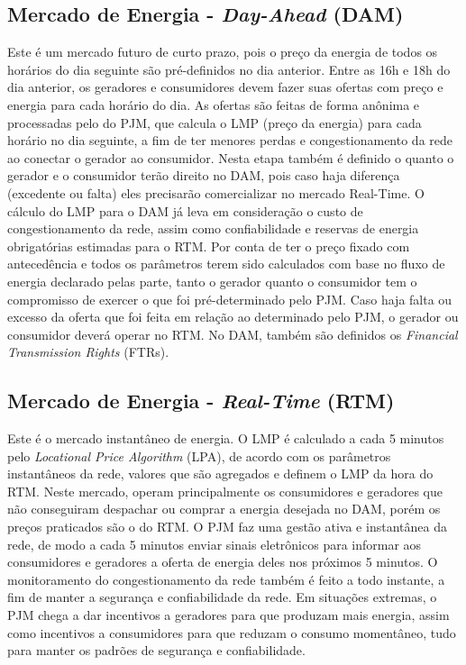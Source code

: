     
\subsection{Mercado de Energia - \textit{Day-Ahead} (DAM)} 
        
Este é um mercado futuro de curto prazo, pois o preço da energia de todos os horários do dia seguinte são pré-definidos no dia anterior. Entre as 16h e 18h do dia anterior, os geradores e consumidores devem fazer suas ofertas com preço e energia para cada horário do dia. As ofertas são feitas de forma anônima e processadas pelo do PJM, que calcula o \ac{LMP} (preço da energia) para cada horário no dia seguinte, a fim de ter menores perdas e congestionamento da rede ao conectar o gerador ao consumidor. Nesta etapa também é definido o quanto o gerador e o consumidor terão direito no \ac{DAM}, pois caso haja diferença (excedente ou falta) eles precisarão comercializar no mercado Real-Time. O cálculo do \ac{LMP} para o \ac{DAM} já leva em consideração o custo de congestionamento da rede, assim como confiabilidade e reservas de energia obrigatórias estimadas para o \ac{RTM}.  Por conta de ter o preço fixado com antecedência e todos os parâmetros terem sido calculados com base no fluxo de energia declarado pelas parte, tanto o gerador quanto o consumidor tem o compromisso de  exercer o que foi pré-determinado pelo PJM. Caso haja falta ou excesso da oferta que foi feita em relação ao determinado pelo PJM, o gerador ou consumidor deverá operar no \ac{RTM}. No \ac{DAM}, também são definidos os \textit{Financial Transmission Rights} (FTRs).

    

\subsection{Mercado de Energia - \textit{Real-Time} (RTM)}

Este é o mercado instantâneo de energia. O \ac{LMP} é calculado a cada 5 minutos pelo \textit{Locational Price Algorithm} (LPA), de acordo com os parâmetros instantâneos da rede, valores que são agregados e definem o \ac{LMP} da hora do \ac{RTM}. Neste mercado, operam principalmente os consumidores e geradores que não conseguiram despachar ou comprar a energia desejada no \ac{DAM}, porém os preços praticados são o do \ac{RTM}. O PJM faz uma gestão ativa e instantânea da rede, de modo a cada 5 minutos enviar sinais eletrônicos para informar aos consumidores e geradores a oferta de energia deles nos próximos 5 minutos. O monitoramento do congestionamento da rede também é feito a todo instante, a fim de manter a segurança e confiabilidade da rede. Em situações extremas, o PJM chega a dar incentivos a geradores para que produzam mais energia, assim como incentivos a consumidores para que reduzam o consumo momentâneo, tudo para manter os padrões de segurança e confiabilidade.

